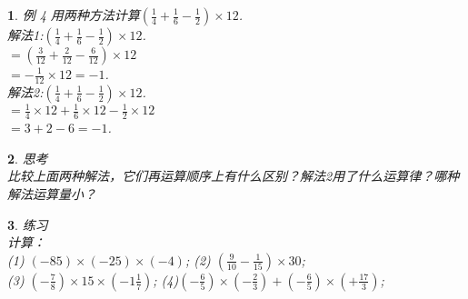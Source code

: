\documentclass[11pt]{article}
\newtheorem{exercise}{ }
\begin{document}
\begin{exercise}
例 4 用两种方法计算$ (\frac{1}{4} + \frac{1}{6} -\frac{1}{2})\times 12 $.\\
解法1:$ (\frac{1}{4} + \frac{1}{6} -\frac{1}{2})\times 12 $.\\
$=(\frac{3}{12} + \frac{2}{12} -\frac{6}{12})\times 12 $\\
$=-\frac{1}{12} \times 12=-1 $.\\
解法2:$ (\frac{1}{4} + \frac{1}{6} -\frac{1}{2})\times 12 $.\\
$ =\frac{1}{4} \times 12 +\frac{1}{6} \times 12 - \frac{1}{2} \times 12 $\\
$ =3+2-6 = -1 $.
\end{exercise}

\begin{exercise}
思考\\
    比较上面两种解法，它们再运算顺序上有什么区别？解法2用了什么运算律？哪种解法运算量小？\\
\end{exercise}

\begin{exercise}
练习\\

计算：\\
(1) $(-85) \times (-25) \times (-4)$;
(2) $ (\frac{9}{10} - \frac{1}{15}) \times 30 $;\\
(3) $ (-\frac{7}{8}) \times 15 \times (-1\frac{1}{7}) $;
(4)$ (-\frac{6}{5}) \times (-\frac{2}{3}) + (-\frac{6}{5}) \times (+\frac{17}{3}) $;\\
\end{exercise}
\end{document}
